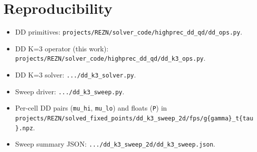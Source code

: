 \documentclass[11pt]{article}
\begin{document}
\section{Reproducibility}

\begin{itemize}
  \item DD primitives:
        \texttt{projects/REZN/solver\_code/highprec\_dd\_qd/dd\_ops.py}.
  \item DD K=3 operator (this work):
        \texttt{projects/REZN/solver\_code/highprec\_dd\_qd/dd\_k3\_ops.py}.
  \item DD K=3 solver:
        \texttt{.../dd\_k3\_solver.py}.
  \item Sweep driver: \texttt{.../dd\_k3\_sweep.py}.
  \item Per-cell DD pairs (\texttt{mu\_hi}, \texttt{mu\_lo}) and floats
        (\texttt{P}) in \\
        \texttt{projects/REZN/solved\_fixed\_points/dd\_k3\_sweep\_2d/fps/g\{gamma\}\_t\{tau\}.npz}.
  \item Sweep summary JSON: \texttt{.../dd\_k3\_sweep\_2d/dd\_k3\_sweep.json}.
\end{itemize}
\end{document}
